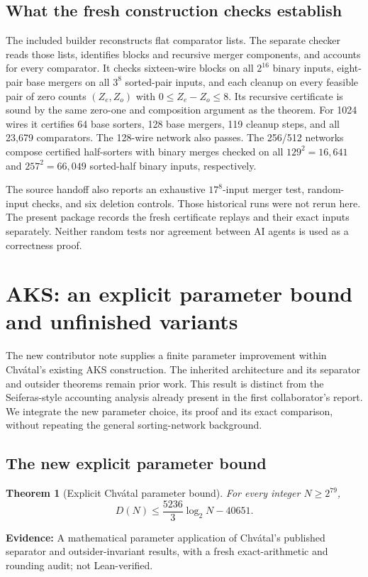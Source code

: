 \documentclass[11pt]{article}
\newtheorem{theorem}{Theorem}[section]
\newcommand{\status}[1]{\textbf{Evidence:} #1.}
\begin{document}
\subsection{What the fresh construction checks establish}
The included builder reconstructs flat comparator lists. The separate checker reads those lists, identifies blocks and recursive merger components, and accounts for every comparator. It checks sixteen-wire blocks on all $2^{16}$ binary inputs, eight-pair base mergers on all $3^8$ sorted-pair inputs, and each cleanup on every feasible pair of zero counts $(Z_e,Z_o)$ with $0\le Z_e-Z_o\le8$. Its recursive certificate is sound by the same zero-one and composition argument as the theorem. For 1024 wires it certifies 64 base sorters, 128 base mergers, 119 cleanup steps, and all 23,679 comparators. The 128-wire network also passes. The 256/512 networks compose certified half-sorters with binary merges checked on all $129^2=16,641$ and $257^2=66,049$ sorted-half binary inputs, respectively.

The source handoff also reports an exhaustive $17^8$-input merger test, random-input checks, and six deletion controls. Those historical runs were not rerun here. The present package records the fresh certificate replays and their exact inputs separately. Neither random tests nor agreement between AI agents is used as a correctness proof.

\section{AKS: an explicit parameter bound and unfinished variants}\label{sec:akswork}
The new contributor note supplies a finite parameter improvement within Chv\'atal's existing AKS construction. The inherited architecture and its separator and outsider theorems remain prior work. This result is distinct from the Seiferas-style accounting analysis already present in the first collaborator's report. We integrate the new parameter choice, its proof and its exact comparison, without repeating the general sorting-network background.

\subsection{The new explicit parameter bound}\label{sec:newaks}
\begin{theorem}[Explicit Chv\'atal parameter bound]\label{thm:newaks}
For every integer $N\ge2^{79}$,
\[
D(N)\le \frac{5236}{3}\log_2N-40651.
\]
\end{theorem}
\status{A mathematical parameter application of Chv\'atal's published separator and outsider-invariant results, with a fresh exact-arithmetic and rounding audit; not Lean-verified}
\end{document}
